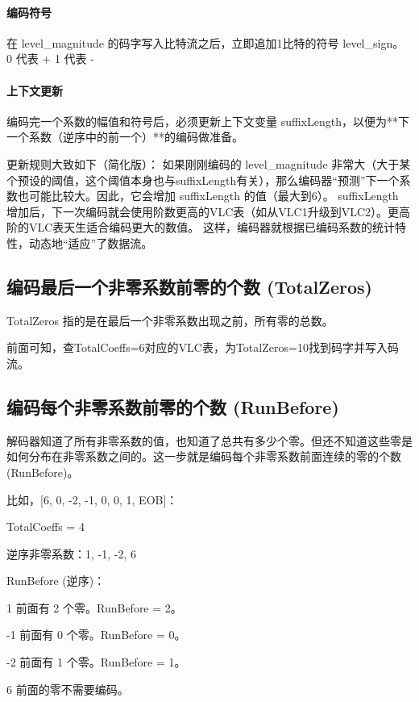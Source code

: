 \documentclass{/Users/hi/Study/template/code}
\begin{document}
\paragraph{编码符号}
在 level\_magnitude 的码字写入比特流之后，立即追加1比特的符号 level\_sign。
0 代表 +
1 代表 -

\paragraph{上下文更新}
编码完一个系数的幅值和符号后，必须更新上下文变量 suffixLength，以便为**下一个系数（逆序中的前一个）**的编码做准备。

更新规则大致如下（简化版）：
如果刚刚编码的 level\_magnitude 非常大（大于某个预设的阈值，这个阈值本身也与suffixLength有关），那么编码器“预测”下一个系数也可能比较大。因此，它会增加 suffixLength 的值（最大到6）。
suffixLength 增加后，下一次编码就会使用阶数更高的VLC表（如从VLC1升级到VLC2）。更高阶的VLC表天生适合编码更大的数值。
这样，编码器就根据已编码系数的统计特性，动态地“适应”了数据流。







\subsection{编码最后一个非零系数前零的个数 (TotalZeros)}
TotalZeros 指的是在最后一个非零系数出现之前，所有零的总数。

前面可知，查TotalCoeffs=6对应的VLC表，为TotalZeros=10找到码字并写入码流。


\subsection{编码每个非零系数前零的个数 (RunBefore)}
解码器知道了所有非零系数的值，也知道了总共有多少个零。但还不知道这些零是如何分布在非零系数之间的。这一步就是编码每个非零系数前面连续的零的个数 (RunBefore)。

比如，[6, 0, -2, -1, 0, 0, 1, EOB]：

TotalCoeffs = 4

逆序非零系数：1, -1, -2, 6

RunBefore (逆序)：

1 前面有 2 个零。RunBefore = 2。

-1 前面有 0 个零。RunBefore = 0。

-2 前面有 1 个零。RunBefore = 1。

6 前面的零不需要编码。
\end{document}

